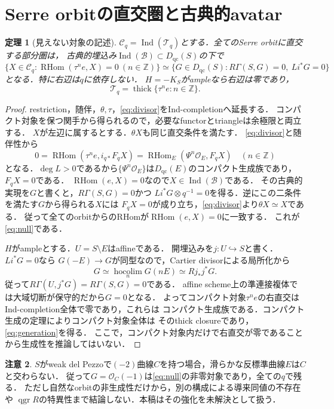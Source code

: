 \documentclass[11pt,a4paper]{ltjsarticle}
\newtheorem{theorem}{定理}[section]
\theoremstyle{definition}
\newtheorem{remark}[theorem]{注意}
\newcommand{\OO}{\mathcal O}
\newcommand{\BB}{\mathcal B}
\newcommand{\TT}{\mathcal T}
\newcommand{\Dqc}{D_{\mathrm{qc}}}
\newcommand{\RHom}{\operatorname{RHom}}
\newcommand{\qgr}{\operatorname{qgr}}
\newcommand{\thick}{\operatorname{thick}}
\newcommand{\Ind}{\operatorname{Ind}}
\begin{document}
\section{Serre orbitの直交圏と古典的avatar}\label{sec:generation}
\begin{theorem}[見えない対象の記述]\label{thm:null}
$\mathcal C_q=\Ind(\TT_q)$とする．全てのSerre orbitに直交する部分圏は，
古典的埋込み$\Ind(\BB)\subset\Dqc(S)$の下で
\begin{equation}\label{eq:null}
 \{X\in\mathcal C_q:\RHom(\tau^ne,X)=0\ (n\in\mathbb Z)\}
 \simeq
 \{G\in\Dqc(S):R\Gamma(S,G)=0,\ Li^*G=0\}
\end{equation}
となる．特に右辺は$q$に依存しない．
$H=-K_S$がampleなら右辺は零であり，
\begin{equation}\label{eq:generation}
 \TT_q=\thick\{\tau^ne:n\in\mathbb Z\}.
\end{equation}
\end{theorem}
\begin{proof}
restriction，随伴，$\theta,\tau$，\eqref{eq:divisor}をInd-completionへ延長する．
コンパクト対象を保つ関手から得られるので，必要なfunctorとtriangleは余極限と両立する．
$X$が左辺に属するとする．$\theta X$も同じ直交条件を満たす．
\eqref{eq:divisor}と随伴性から
\[
 0=\RHom(\tau^ne,i_{q*}F_qX)
   =\RHom_E(\Psi^n\OO_E,F_qX)\quad(n\in\mathbb Z)
\]
となる．$\deg L>0$であるから$\{\Psi^n\OO_E\}$は$\Dqc(E)$のコンパクト生成族であり，
$F_qX=0$である．
$\RHom(e,X)=0$なので$X\in\Ind(\BB)$である．
その古典的実現を$G$と書くと，$R\Gamma(S,G)=0$かつ
$Li^*G\otimes q^{-1}=0$を得る．逆にこの二条件を満たす$G$から得られる$X$には
$F_qX=0$が成り立ち，\eqref{eq:divisor}より$\theta X\simeq X$である．
従って全てのorbitからのRHomが$\RHom(e,X)=0$に一致する．
これが\eqref{eq:null}である．

$H$がampleとする．$U=S\setminus E$はaffineである．
開埋込みを$j:U\hookrightarrow S$と書く．$Li^*G=0$なら
$G(-E)\to G$が同型なので，Cartier divisorによる局所化から
\[
 G\simeq\underset{n}{\operatorname{hocolim}}G(nE)
   \simeq Rj_*j^*G.
\]
従って$R\Gamma(U,j^*G)=R\Gamma(S,G)=0$である．
affine scheme上の準連接複体では大域切断が保守的だから$G=0$となる．
よってコンパクト対象$\tau^ne$の右直交はInd-completion全体で零であり，これらは
コンパクト生成族である．コンパクト生成の定理によりコンパクト対象全体は
そのthick closureであり，\eqref{eq:generation}を得る．
ここで，コンパクト対象内だけで右直交が零であることから生成性を推論してはいない．
\end{proof}

\begin{remark}
$S$がweak del Pezzoで$(-2)$曲線$C$を持つ場合，滑らかな反標準曲線$E$は$C$と交わらない．
従って$G=\OO_C(-1)$は\eqref{eq:null}の非零対象であり，全ての$q$で残る．
ただし自然なorbitの非生成性だけから，別の構成による導来同値の不存在や
$\qgr R$の特異性まで結論しない．本稿はその強化を未解決として扱う．
\end{remark}
\end{document}
